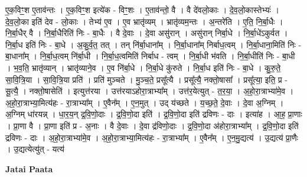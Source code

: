 \documentclass[17pt]{extarticle}
\begin{document}
ए॒क॒विꣳ॒॒श ए॒ताव॑न्तः । ए॒क॒विꣳ॒॒श इत्ये॑क - विꣳ॒॒शः । ए॒ताव॑न्तो॒ वै । वै दे॑वलो॒काः । दे॒व॒लो॒कास्तेभ्यः॑ । दे॒व॒लो॒का इति॑ देव - लो॒काः । तेभ्य॑ ए॒व । ए॒व भ्रातृ॑व्यम् । भ्रातृ॑व्यम॒न्तः । अ॒न्तरे॑ति । ए॒ति॒ नि॒र्बा॒धैः । नि॒र्बा॒धैर् वै । नि॒र्बा॒धैरिति॑ निः - बा॒धैः । वै दे॒वाः । दे॒वा असु॑रान् । असु॑रान् निर्बा॒धे । नि॒र्बा॒धे॑ऽकुर्वत । नि॒र्बा॒ध इति॑ निः - बा॒धे । अ॒कु॒र्व॒त॒ तत् । तन् नि॑र्बा॒धाना᳚म् । नि॒र्बा॒धाना᳚म् निर्बाध॒त्वम् । नि॒र्बा॒धाना॒मिति॑ निः - बा॒धाना᳚म् । नि॒र्बा॒ध॒त्वम् नि॑र्बा॒धी । नि॒र्बा॒ध॒त्वमिति॑ निर्बाध - त्वम् । नि॒र्बा॒धी भ॑वति । नि॒र्बा॒धीति॑ निः - बा॒धी । भ॒व॒ति॒ भ्रातृ॑व्यान् । भ्रातृ॑व्याने॒व । ए॒व नि॑र्बा॒धे । नि॒र्बा॒धे कु॑रुते । नि॒र्बा॒ध इति॑ निः - बा॒धे । कु॒रु॒ते॒ सा॒वि॒त्रि॒या । सा॒वि॒त्रि॒या प्रति॑ । प्रति॑ मुञ्चते । मु॒ञ्च॒ते॒ प्रसू᳚त्यै । प्रसू᳚त्यै॒ नक्तो॒षासा᳚ । प्रसू᳚त्या॒ इति॒ प्र - सू॒त्यै॒ । नक्तो॒षासेति॑ । इत्युत्त॑रया । उत्त॑रयाऽहोरा॒त्राभ्या᳚म् । उत्त॑र॒येत्युत् - त॒र॒या॒ । अ॒हो॒रा॒त्राभ्या॑मे॒व । अ॒हो॒रा॒त्राभ्या॒मित्य॑हः - रा॒त्राभ्या᳚म् । ए॒वैन᳚म् । ए॒न॒मुत् । उद् य॑च्छते । य॒च्छ॒ते॒ दे॒वाः । दे॒वा अ॒ग्निम् । अ॒ग्निम् धा॑रयन्न् । धा॒र॒य॒न् द्र॒वि॒णो॒दाः । द्र॒वि॒णो॒दा इति॑ । द्र॒वि॒णो॒दा इति॑ द्रविणः - दाः । इत्या॑ह । आ॒ह॒ प्रा॒णाः । प्रा॒णा वै । प्रा॒णा इति॑ प्र - अ॒नाः । वै दे॒वाः । दे॒वा द्र॑विणो॒दाः । द्र॒वि॒णो॒दा अ॑होरा॒त्राभ्या᳚म् । द्र॒वि॒णो॒दा इति॑ द्रविणः - दाः । अ॒हो॒रा॒त्राभ्या॑मे॒व । अ॒हो॒रा॒त्राभ्या॒मित्य॑हः - रा॒त्राभ्या᳚म् । ए॒वैन᳚म् । ए॒न॒मु॒द्यत्य॑ । उ॒द्यत्य॑ प्रा॒णैः । उ॒द्यत्येत्यु॑त् - यत्य॑ \newline

\textbf{Jatai Paata} \newline
\end{document}
